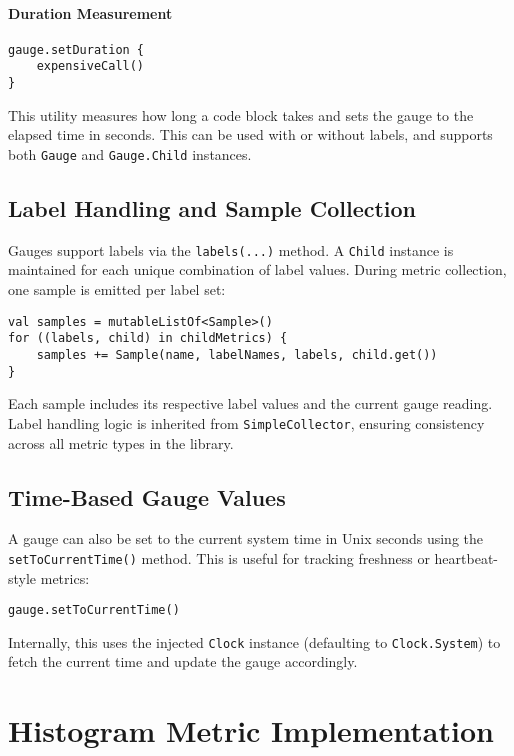 \paragraph{Duration Measurement}

\begin{verbatim}
gauge.setDuration {
    expensiveCall()
}
\end{verbatim}

This utility measures how long a code block takes and sets the gauge to the elapsed time in seconds. This can be used with or without labels, and supports both \texttt{Gauge} and \texttt{Gauge.Child} instances.

\subsection{Label Handling and Sample Collection}
Gauges support labels via the \texttt{labels(...)} method. A \texttt{Child} instance is maintained for each unique combination of label values. During metric collection, one sample is emitted per label set:

\begin{verbatim}
val samples = mutableListOf<Sample>()
for ((labels, child) in childMetrics) {
    samples += Sample(name, labelNames, labels, child.get())
}
\end{verbatim}

Each sample includes its respective label values and the current gauge reading. Label handling logic is inherited from \texttt{SimpleCollector}, ensuring consistency across all metric types in the library.

\subsection{Time-Based Gauge Values}
A gauge can also be set to the current system time in Unix seconds using the \texttt{setToCurrentTime()} method. This is useful for tracking freshness or heartbeat-style metrics:

\begin{verbatim}
gauge.setToCurrentTime()
\end{verbatim}

Internally, this uses the injected \texttt{Clock} instance (defaulting to \texttt{Clock.System}) to fetch the current time and update the gauge accordingly.




\section{Histogram Metric Implementation}

